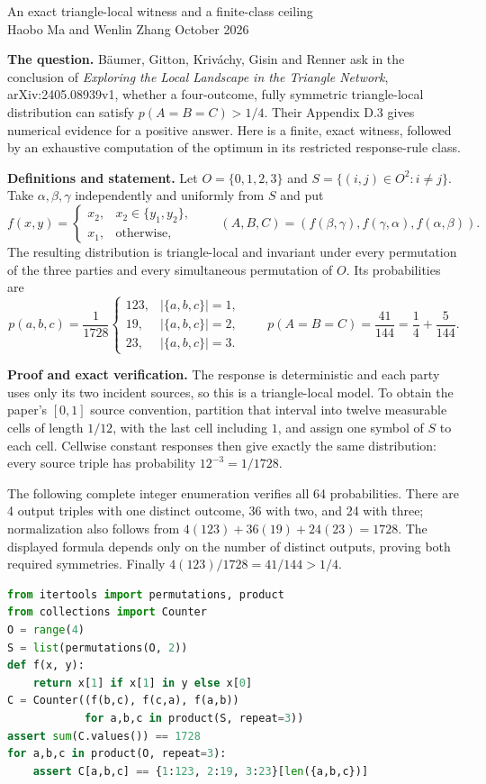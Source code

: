 \documentclass[11pt]{article}
\begin{document}
\begin{center}
{\Large An exact triangle-local witness and a finite-class ceiling}\\[5pt]
Haobo Ma and Wenlin Zhang  October 2026
\end{center}

\textbf{The question.}
B\"aumer, Gitton, Kriv\'achy, Gisin and Renner ask in the conclusion of
\emph{Exploring the Local Landscape in the Triangle Network},
arXiv:2405.08939v1, whether a four-outcome, fully symmetric triangle-local
distribution can satisfy $p(A=B=C)>1/4$. Their Appendix D.3 gives numerical
evidence for a positive answer. Here is a finite, exact witness, followed by
an exhaustive computation of the optimum in its restricted response-rule class.

\textbf{Definitions and statement.}
Let $O=\{0,1,2,3\}$ and $S=\{(i,j)\in O^2:i\ne j\}$.
Take $\alpha,\beta,\gamma$ independently and uniformly from $S$ and put
\[
 f(x,y)=\begin{cases}x_2,&x_2\in\{y_1,y_2\},\\x_1,&\text{otherwise},\end{cases}
 \qquad (A,B,C)=(f(\beta,\gamma),f(\gamma,\alpha),f(\alpha,\beta)).
\]
The resulting distribution is triangle-local and invariant under every
permutation of the three parties and every simultaneous permutation of $O$.
Its probabilities are
\[
 p(a,b,c)=\frac{1}{1728}
 \begin{cases}123,&|\{a,b,c\}|=1,\\19,&|\{a,b,c\}|=2,\\23,&|\{a,b,c\}|=3.\end{cases}
 \qquad p(A=B=C)=\frac{41}{144}=\frac14+\frac5{144}.
\]

\textbf{Proof and exact verification.}
The response is deterministic and each party uses only its two incident sources,
so this is a triangle-local model. To obtain the paper's $[0,1]$ source convention,
partition that interval into twelve measurable cells of length $1/12$, with the
last cell including $1$, and assign one symbol of $S$ to each cell. Cellwise
constant responses then give exactly the same distribution: every source triple
has probability $12^{-3}=1/1728$.

The following complete integer enumeration verifies all 64 probabilities.
There are 4 output triples with one distinct outcome, 36 with two, and 24 with
three; normalization also follows from
$4(123)+36(19)+24(23)=1728$.
The displayed formula depends only on the number of distinct outputs, proving
both required symmetries. Finally $4(123)/1728=41/144>1/4$.
\begin{lstlisting}[language=Python]
from itertools import permutations, product
from collections import Counter
O = range(4)
S = list(permutations(O, 2))
def f(x, y):
    return x[1] if x[1] in y else x[0]
C = Counter((f(b,c), f(c,a), f(a,b))
            for a,b,c in product(S, repeat=3))
assert sum(C.values()) == 1728
for a,b,c in product(O, repeat=3):
    assert C[a,b,c] == {1:123, 2:19, 3:23}[len({a,b,c})]
\end{lstlisting}
\end{document}
